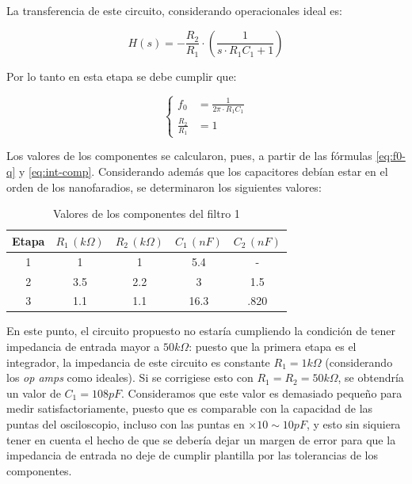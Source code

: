 \documentclass[../../tc_tp5_main.tex]{subfiles}
\begin{document}
La transferencia de este circuito, considerando operacionales ideal es:

\begin{equation}
	H(s) = - \frac{R_2}{R_1} \cdot \left(\frac{1}{s \cdot R_1 C_1 + 1}\right)
\end{equation}

Por lo tanto en esta etapa se debe cumplir que:

\begin{equation}
	\left\{
 	\begin{aligned}
 		f_0 &= \frac{1}{2\pi \cdot R_1 C_1} \\
 		\frac{R_2}{R_1} &= 1
	\end{aligned}
	\right.
	\label{eq:int-comp}
\end{equation}

Los valores de los componentes se calcularon, pues, a partir de las f\'ormulas \ref{eq:f0-q} y \ref{eq:int-comp}. Considerando adem\'as que los capacitores deb\'ian estar en el orden de los nanofaradios, se determinaron los siguientes valores:

\begin{table}[H]
	\centering
	\begin{tabular}{|c||c|c|c|c|}
	\hline
	Etapa & $R_1\, (k\Omega)$ & $R_2\, (k\Omega)$ & $C_1\, (nF)$ & $C_2\, (nF)$ \\ \hline \hline
	1     & 1                 & 1                 & 5.4          & -            \\ \hline
	2     & 3.5               & 2.2               & 3            & 1.5          \\ \hline
	3     & 1.1               & 1.1               & 16.3         & .820         \\ \hline
	\end{tabular}
	\caption{Valores de los componentes del filtro 1}
\end{table}

En este punto, el circuito propuesto no estar\'ia cumpliendo la condici\'on de tener impedancia de entrada mayor a $50k\Omega$: puesto que la primera etapa es el integrador, la impedancia de este circuito es constante $R_1 = 1k\Omega$ (considerando los \textit{op amps} como ideales). Si se corrigiese esto con $R_1 = R_2 = 50k\Omega$, se obtendr\'ia un valor de $C_1 = 108pF$. Consideramos que este valor es demasiado peque\~no para medir satisfactoriamente, puesto que es comparable con la capacidad de las puntas del osciloscopio, incluso con las puntas en $\times 10 \sim 10pF$, y esto sin siquiera tener en cuenta el hecho de que se deber\'ia dejar un margen de error para que la impedancia de entrada no deje de cumplir plantilla por las tolerancias de los componentes.\par
\end{document}

